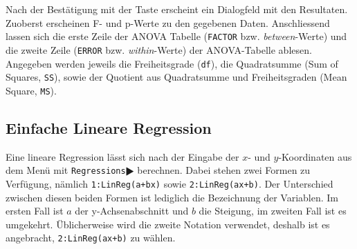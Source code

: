 \documentclass[a4paper,11pt,notitlepage,halfparskip,headsepline,normalheadings,twoside]{scrartcl}
\newlength{\tikey}
\newcommand{\keystroke}[1]{\settowidth{\tikey}{\scriptsize #1}\psframebox[framearc=0.2]{\parbox{\tikey}{\scriptsize\textsf{#1}}}}
\begin{document}
\begin{window}
Nach der Bestätigung mit der Taste \keystroke{ENTER} erscheint ein Dialogfeld
mit den Resultaten. Zuoberst erscheinen F- und p-Werte zu den gegebenen
Daten. Anschliessend lassen sich die erste Zeile der ANOVA Tabelle
(\texttt{FACTOR} bzw. \textit{between}-Werte) und die
zweite Zeile (\texttt{ERROR} bzw. \textit{within}-Werte) der ANOVA-Tabelle ablesen. Angegeben werden
jeweils die Freiheitsgrade (\texttt{df}), die Quadratsumme (Sum of Squares,
\texttt{SS}), sowie der Quotient aus Quadratsumme und Freiheitsgraden (Mean
Square, \texttt{MS}).
\end{window}

\subsection{Einfache Lineare Regression}
\begin{window}
Eine lineare Regression lässt sich nach der Eingabe der $x$- und $y$-Koordinaten
aus dem Menü \keystroke{F4} mit \texttt{Regressions$\RHD$}
berechnen. Dabei stehen zwei Formen zu Verfügung, nämlich
\texttt{1:LinReg(a+bx)} sowie \texttt{2:LinReg(ax+b)}. Der Unterschied zwischen
diesen beiden Formen ist lediglich die Bezeichnung der Variablen. Im ersten Fall
ist $a$ der y-Achsenabschnitt und $b$ die Steigung, im zweiten Fall ist es
umgekehrt. Üblicherweise wird die zweite Notation verwendet, deshalb ist es
angebracht, \texttt{2:LinReg(ax+b)} zu wählen.
\end{window}
\end{document}
